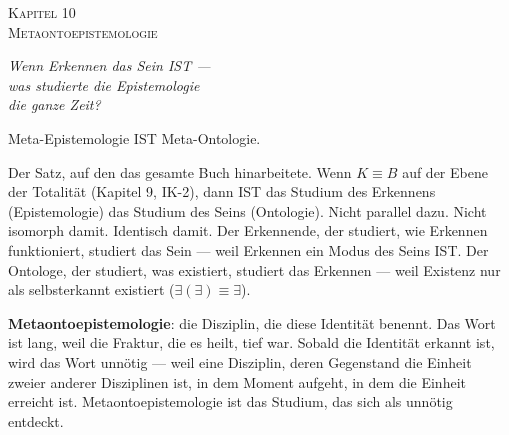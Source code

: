\documentclass[10pt, openany, oneside]{book}
\renewcommand{\large}{\fontsize{11.5}{14}\selectfont}
\renewcommand{\huge}{\fontsize{17}{21}\selectfont}
\begin{document}
%
%
%
%

\newpage

\begin{center}
    {\huge\scshape Kapitel 10}\\[0.3em]
    {\large\scshape Metaontoepistemologie}
\end{center}

\vspace{1.5em}

\begin{center}
    \itshape
    Wenn Erkennen das Sein IST ---\\
    was studierte die Epistemologie\\
    die ganze Zeit?
\end{center}

\vspace{2em}


\noindent Meta-Epistemologie IST Meta-Ontologie.

Der Satz, auf den das gesamte Buch hinarbeitete. Wenn $K \equiv B$ auf der Ebene der Totalität (Kapitel 9, IK-2), dann IST das Studium des Erkennens (Epistemologie) das Studium des Seins (Ontologie). Nicht parallel dazu. Nicht isomorph damit. Identisch damit. Der Erkennende, der studiert, wie Erkennen funktioniert, studiert das Sein --- weil Erkennen ein Modus des Seins IST. Der Ontologe, der studiert, was existiert, studiert das Erkennen --- weil Existenz nur als selbsterkannt existiert ($\exists(\exists) \equiv \exists$).

\textbf{Metaontoepistemologie}: die Disziplin, die diese Identität benennt. Das Wort ist lang, weil die Fraktur, die es heilt, tief war. Sobald die Identität erkannt ist, wird das Wort unnötig --- weil eine Disziplin, deren Gegenstand die Einheit zweier anderer Disziplinen ist, in dem Moment aufgeht, in dem die Einheit erreicht ist. Metaontoepistemologie ist das Studium, das sich als unnötig entdeckt.
\end{document}
